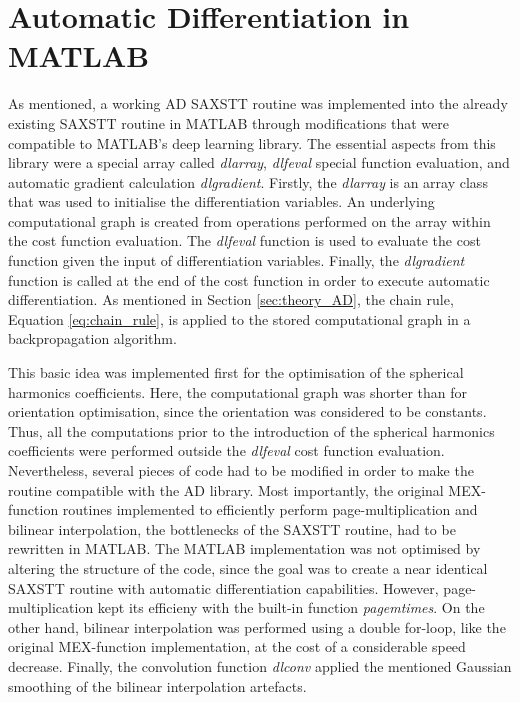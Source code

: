 \section{Automatic Differentiation in MATLAB}%
\label{sec:AD_matlab}
As mentioned,
a working AD SAXSTT routine was implemented into the already existing SAXSTT routine in MATLAB
through modifications that were compatible to MATLAB's deep learning library.
The essential aspects from this library were a special array called \emph{dlarray},
\emph{dlfeval} special function evaluation, and automatic gradient calculation \emph{dlgradient}.
Firstly, the \emph{dlarray} is an array class that was used to initialise the differentiation variables.
An underlying computational graph is created from operations performed on the array within the cost function evaluation.
The \emph{dlfeval} function is used to evaluate the cost function given the input of differentiation variables.
Finally, the \emph{dlgradient} function is called at the end of the cost function in order to execute automatic differentiation.
As mentioned in Section \ref{sec:theory_AD}, the chain rule, Equation \eqref{eq:chain_rule}, is applied to the stored computational graph in a backpropagation algorithm.

This basic idea was implemented first for the optimisation of the spherical harmonics coefficients.
Here, the computational graph was shorter than for orientation optimisation, since the orientation was considered to be constants.
Thus, all the computations prior to the introduction of the spherical harmonics coefficients were performed outside the \emph{dlfeval} cost function evaluation.
Nevertheless, several pieces of code had to be modified in order to make the routine compatible with the AD library.
Most importantly, the original MEX-function routines implemented to efficiently perform page-multiplication and bilinear interpolation, the bottlenecks of the SAXSTT routine, had to be rewritten in MATLAB.
The MATLAB implementation was not optimised by altering the structure of the code, since the goal was to create a near identical SAXSTT routine with automatic differentiation capabilities.
However, page-multiplication kept its efficieny with the built-in function \emph{pagemtimes}.
On the other hand, bilinear interpolation was performed using a double for-loop, like the original MEX-function implementation, at the cost of a considerable speed decrease.
Finally, the convolution function \emph{dlconv} applied the mentioned Gaussian smoothing of the bilinear interpolation artefacts. %

